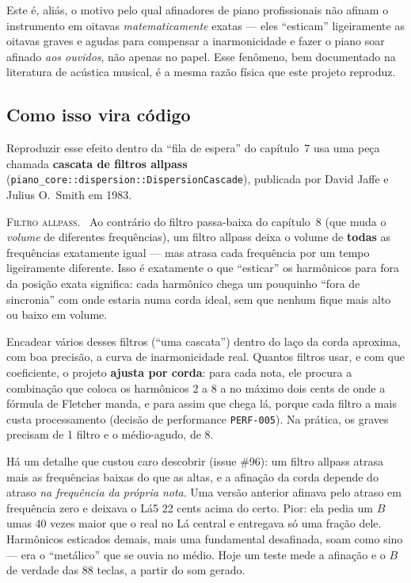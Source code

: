 \documentclass[11pt,oneside]{book}
\newcommand{\nova}[1]{\textsc{\color{accent}#1.}~}
\begin{document}
Este é, aliás, o motivo pelo qual afinadores de piano profissionais não
afinam o instrumento em oitavas \emph{matematicamente} exatas --- eles
\enquote{esticam} ligeiramente as oitavas graves e agudas para compensar a
inarmonicidade e fazer o piano soar afinado \emph{aos ouvidos}, não apenas
no papel. Esse fenômeno, bem documentado na literatura de acústica
musical, é a mesma razão física que este projeto reproduz.

\subsection*{Como isso vira código}

Reproduzir esse efeito dentro da \enquote{fila de espera} do capítulo~7 usa
uma peça chamada \textbf{cascata de filtros allpass}
(\texttt{piano\_core::dispersion::DispersionCascade}), publicada por David
Jaffe e Julius O.\ Smith em 1983.

\begin{newword}
\nova{Filtro allpass} Ao contrário do filtro passa-baixa do capítulo~8 (que
muda o \emph{volume} de diferentes frequências), um filtro allpass deixa o
volume de \textbf{todas} as frequências exatamente igual --- mas atrasa
cada frequência por um tempo ligeiramente diferente. Isso é exatamente o
que \enquote{esticar} os harmônicos para fora da posição exata significa:
cada harmônico chega um pouquinho \enquote{fora de sincronia} com onde
estaria numa corda ideal, sem que nenhum fique mais alto ou baixo em
volume.
\end{newword}

Encadear vários desses filtros (\enquote{uma cascata}) dentro do laço da
corda aproxima, com boa precisão, a curva de inarmonicidade real. Quantos
filtros usar, e com que coeficiente, o projeto \textbf{ajusta por corda}:
para cada nota, ele procura a combinação que coloca os harmônicos 2 a 8 a
no máximo dois cents de onde a fórmula de Fletcher manda, e para assim que
chega lá, porque cada filtro a mais custa processamento (decisão de
performance \texttt{PERF-005}). Na prática, os graves precisam de 1 filtro
e o médio-agudo, de 8.

Há um detalhe que custou caro descobrir (issue \#96): um filtro allpass
atrasa mais as frequências baixas do que as altas, e a afinação da corda
depende do atraso \emph{na frequência da própria nota}. Uma versão anterior
afinava pelo atraso em frequência zero e deixava o Lá5 22 cents acima do
certo. Pior: ela pedia um $B$ umas 40 vezes maior que o real no Lá central e
entregava só uma fração dele. Harmônicos esticados demais, mais uma
fundamental desafinada, soam como sino --- era o \enquote{metálico} que se
ouvia no médio. Hoje um teste mede a afinação e o $B$ de verdade das 88
teclas, a partir do som gerado.
\end{document}
